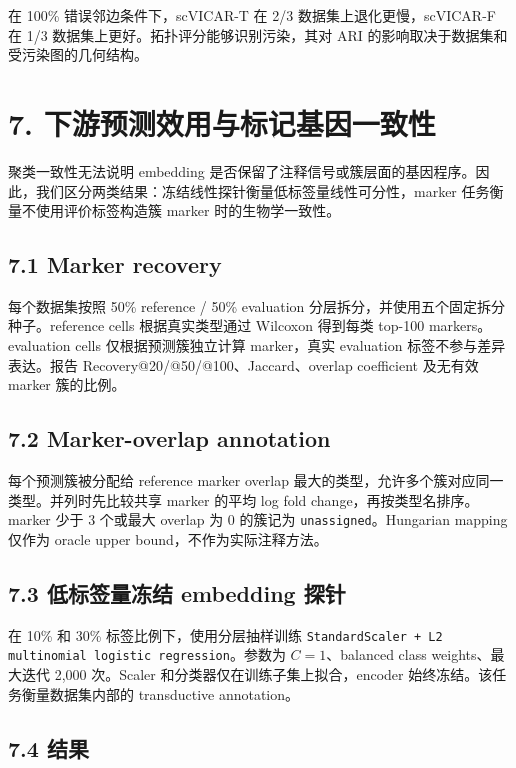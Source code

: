 \documentclass[journal]{IEEEtran}
\begin{document}
在 100\% 错误邻边条件下，scVICAR-T 在 2/3 数据集上退化更慢，scVICAR-F 在 1/3 数据集上更好。拓扑评分能够识别污染，其对 ARI 的影响取决于数据集和受污染图的几何结构。

\section{7. 下游预测效用与标记基因一致性}

聚类一致性无法说明 embedding 是否保留了注释信号或簇层面的基因程序。因此，我们区分两类结果：冻结线性探针衡量低标签量线性可分性，marker 任务衡量不使用评价标签构造簇 marker 时的生物学一致性。

\subsection{7.1 Marker recovery}

每个数据集按照 50\% reference / 50\% evaluation 分层拆分，并使用五个固定拆分种子。reference cells 根据真实类型通过 Wilcoxon 得到每类 top-100 markers。evaluation cells 仅根据预测簇独立计算 marker，真实 evaluation 标签不参与差异表达。报告 Recovery@20/@50/@100、Jaccard、overlap coefficient 及无有效 marker 簇的比例。

\subsection{7.2 Marker-overlap annotation}

每个预测簇被分配给 reference marker overlap 最大的类型，允许多个簇对应同一类型。并列时先比较共享 marker 的平均 log fold change，再按类型名排序。marker 少于 3 个或最大 overlap 为 0 的簇记为 \texttt{unassigned}。Hungarian mapping 仅作为 oracle upper bound，不作为实际注释方法。

\subsection{7.3 低标签量冻结 embedding 探针}

在 10\% 和 30\% 标签比例下，使用分层抽样训练 \texttt{StandardScaler + L2 multinomial logistic regression}。参数为 $C=1$、balanced class weights、最大迭代 2,000 次。Scaler 和分类器仅在训练子集上拟合，encoder 始终冻结。该任务衡量数据集内部的 transductive annotation。

\subsection{7.4 结果}
\end{document}
